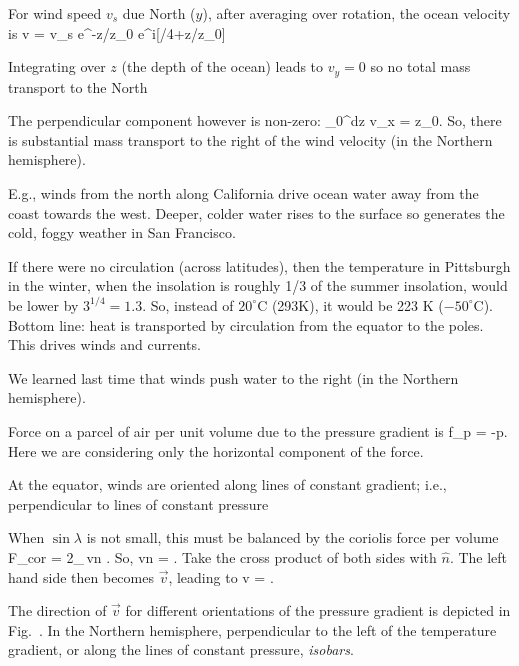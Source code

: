 \documentclass[11pt]{book}
\begin{document}
\item For wind speed $v_s$ due North ($\hat y$), after averaging over rotation, the ocean velocity is
\be \vec v = v_s  e^{-z/z_0} e^{i[\pi/4+z/z_0]}\ee
\item Integrating over $z$ (the depth of the ocean) leads to $v_y=0$ so no total mass transport to the North
\item The perpendicular component however is non-zero:
\be
\int_0^\infty dz v_x =  z_0.\ee
So, there is substantial mass transport to the right of the wind velocity (in the Northern hemisphere). 
\item E.g., winds from the north along California drive ocean water away from the coast towards the west. Deeper, colder water rises to the surface so generates the cold, foggy weather in San Francisco.
\eee
\eei



If there were no circulation (across latitudes), then the temperature in Pittsburgh in the winter, when the insolation is roughly 1/3 of the summer insolation, would be lower by $3^{1/4}=1.3$. So, instead of $20^\circ$C (293K), it would be 223 K ($-50^\circ$C). Bottom line: heat is transported by circulation from the equator to the poles. This drives winds and currents.



We learned last time that winds push water to the right (in the Northern hemisphere).



\bei
\item
Force on a parcel of air per unit volume due to the pressure gradient is
\be
\vec f_p = -\nabla p.\ee
Here we are considering only the horizontal component of the force. 
\item At the equator, winds are oriented along lines of constant gradient; i.e., perpendicular to lines of constant pressure
\item When $\sin\lambda$ is not small, this must be balanced by the coriolis force per volume
\be
\vec F_{cor} = 2\rho\omega_\Earth\sin\lambda\,\vec v\times \hat n
.\ee
So,
\be\vec v\times\hat n = 
.\ee
Take the cross product of both sides with $\hat n$. The left hand side then becomes $\vec v$, leading to
\be
\vec v = .\ee
\item 
The direction of $\vec v$ for different orientations of the pressure gradient is depicted in Fig.~. In the Northern hemisphere, perpendicular to the left of the temperature gradient, or along the lines of constant pressure, {\it isobars}.
\eei
\end{document}
